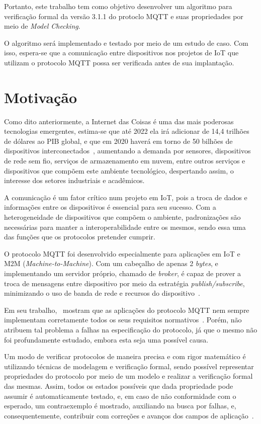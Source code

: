 Portanto, este trabalho tem como objetivo desenvolver um algoritmo para verificação formal da versão 3.1.1 do protoclo MQTT e suas propriedades por meio de \textit{Model Checking}.

O algoritmo será implementado e testado por meio de um estudo de caso. Com isso, espera-se que a comunicação entre dispositivos nos projetos de IoT que utilizam o protocolo MQTT possa ser verificada antes de sua implantação.

\section{Motivação}

Como dito anteriormente, a Internet das Coisas é uma das mais poderosas tecnologias emergentes, estima-se que até 2022 ela irá adicionar de 14,4 trilhões de dólares ao PIB global, e que em 2020 haverá em torno de 50 bilhões de dispositivos interconectados~\cite{morgan2014forbes}, aumentando a demanda por sensores, dispositivos de rede sem fio, serviços de armazenamento em nuvem, entre outros serviços e dispositivos que compõem este ambiente tecnológico, despertando assim, o interesse dos setores industriais e acadêmicos.

A comunicação é um fator crítico num projeto em IoT, pois a troca de dados e informações entre os dispositivos é essencial para seu sucesso. Com a heterogeneidade de dispositivos que compõem o ambiente, padronizações são necessárias para manter a interoperabilidade entre os mesmos, sendo essa uma das funções que os protocolos pretender cumprir.

O protocolo MQTT foi desenvolvido especialmente para aplicações em IoT e M2M (\textit{Machine-to-Machine}). Com um cabeçalho de apenas 2 \textit{bytes}, e implementando um servidor próprio, chamado de \textit{broker}, é capaz de prover a troca de mensagens entre dispositivo por meio da estratégia \textit{publish/subscribe}, minimizando o uso de banda de rede e recursos do dispositivo~\cite{mqttv3.1.1}. 

Em seu trabalho,~\citeauthor{mladenov2017formal} mostram que as aplicações do protocolo MQTT nem sempre implementam corretamente todos os seus requisitos normativos~\cite{mladenov2017formal}. Porém, não atribuem tal problema a falhas na especificação do protocolo, já que o mesmo não foi profundamente estudado, embora esta seja uma possível causa.

Um modo de verificar protocolos de maneira precisa e com rigor matemático é utilizando técnicas de modelagem e verificação formal, sendo possível representar propriedades do protocolo por meio de um modelo e realizar a verificação formal das mesmas. Assim, todos os estados possíveis que dada propriedade pode assumir é automaticamente testado, e, em caso de não conformidade com o esperado, um contraexemplo é mostrado, auxiliando na busca por falhas, e, consequentemente, contribuir com correções e avanços dos campos de aplicação~\cite{clarke1999model}. 

